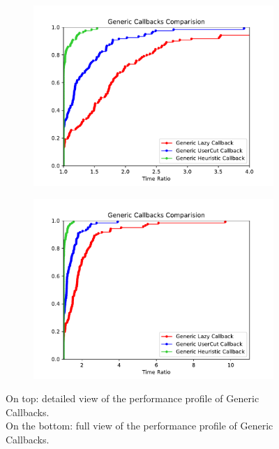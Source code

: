 \begin{figure}[h!]
  \centering
  \begin{subfigure}[b]{0.97\linewidth}
    \includegraphics[width=\linewidth]{media/GenericCallbacks.pdf}
  \end{subfigure}
  \begin{subfigure}[b]{0.97\linewidth}
  \ContinuedFloat
    \includegraphics[width=\linewidth]{media/GenericCallbacks1.pdf}
  \end{subfigure}
  \caption{On top: detailed view of the performance profile of Generic Callbacks. \\On the bottom: full view of the performance profile of Generic Callbacks.}
  \label{fig:gen}
\end{figure}

